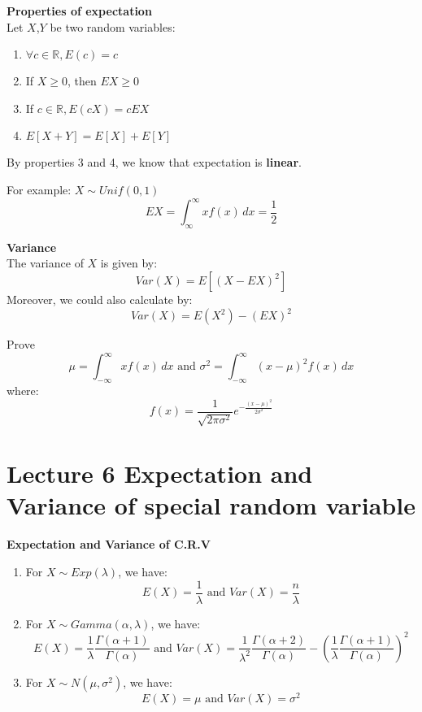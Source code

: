 \documentclass{article}
\begin{document}
\begin{theorem}
    \textbf{Properties of expectation}\\
    Let $X$,$Y$ be two random variables:
    \begin{enumerate}
        \item $\forall c \in \mathbb{R}, E(c) = c$
        \item If $X \geq 0$, then $EX \geq 0$
        \item If $c \in \mathbb{R}, E(cX) = cEX$
        \item $E[X+Y] = E[X] + E[Y]$
    \end{enumerate}
    By properties 3 and 4, we know that expectation is \textbf{linear}.
\end{theorem}
For example: $X \sim Unif(0,1)$
$$ EX = \int^{\infty}_{\infty} xf(x) \, dx = \frac{1}{2}$$
\begin{definition}
    \textbf{Variance}\\
    The variance of $X$ is given by:
    $$ Var(X) = E[(X - EX)^2]$$
    Moreover, we could also calculate by:
    $$ Var(X) = E(X^2) - (EX)^2$$
\end{definition}

\begin{quiz}
    Prove
    $$ \mu = \int^\infty_{-\infty}xf(x) \, dx \text{ and } \sigma^2 = \int^\infty_{-\infty}(x-\mu)^2f(x) \, dx$$
    where:
    $$ f(x) = \frac{1}{\sqrt{2\pi\sigma^2}}e^{-\frac{(x - \mu)^2}{2\sigma^2}}$$
\end{quiz}


\section{Lecture 6 Expectation and Variance of special random variable}
\begin{theorem}
    \textbf{Expectation and Variance of C.R.V}
    \begin{enumerate}
        \item For $X \sim Exp(\lambda)$, we have:
        $$ E(X) = \frac{1}{\lambda} \text{ and } Var(X) = \frac{n}{\lambda}$$
        \item For $X \sim Gamma(\alpha, \lambda)$, we have:
        $$ E(X) = \frac{1}{\lambda}\frac{\Gamma(\alpha+1)}{\Gamma(\alpha)}\text{ and } Var(X) = \frac{1}{\lambda^2}\frac{\Gamma(\alpha+2)}{\Gamma(\alpha)} - (\frac{1}{\lambda}\frac{\Gamma(\alpha+1)}{\Gamma(\alpha)})^2$$
        \item For $X \sim N(\mu, \sigma^2)$, we have:
        $$ E(X) = \mu \text{ and } Var(X) = \sigma^2$$
    \end{enumerate}
\end{theorem}
\end{document}
